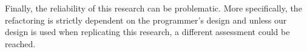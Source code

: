 Finally, the reliability of this research can be problematic.
More specifically, the refactoring is strictly dependent on the programmer's design and unless our design is used when replicating this research, a different assessment could be reached.
